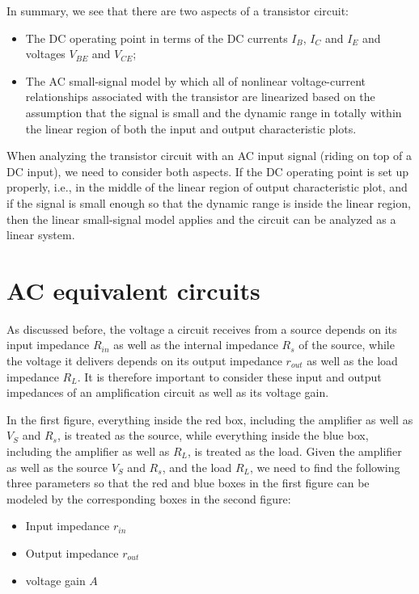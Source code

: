 \begin{itemize}
In summary, we see that there are two aspects of a transistor circuit:
\begin{itemize}
\item The DC operating point in terms of the DC currents $I_B$, $I_C$ 
  and $I_E$ and voltages $V_{BE}$ and $V_{CE}$;
\item The AC small-signal model by which all of nonlinear voltage-current 
  relationships associated with the transistor are linearized based 
  on the assumption that the signal is small and the dynamic range 
  in totally within the linear region of both the input and output
  characteristic plots. 
\end{itemize}
When analyzing the transistor circuit with an AC input signal (riding 
on top of a DC input), we need to consider both aspects. If the DC 
operating point is set up properly, i.e., in the middle of the linear
region of output characteristic plot, and if the signal is small enough 
so that the dynamic range is inside the linear region, then the linear 
small-signal model applies and the circuit can be analyzed as a linear 
system.


\section*{AC equivalent circuits}

As discussed before, the voltage a circuit receives from a source 
depends on its input impedance $R_{in}$ as well as the internal 
impedance $R_s$ of the source, while the voltage it delivers depends
on its output impedance $r_{out}$ as well as the load impedance $R_L$.
It is therefore important to consider these input and output impedances
of an amplification circuit as well as its voltage gain.


In the first figure, everything inside the red box, including the 
amplifier as well as $V_S$ and $R_s$, is treated as the source, while 
everything inside the blue box, including the amplifier as well as $R_L$,
is treated as the load. Given the amplifier as well as the source $V_S$ 
and $R_s$, and the load $R_L$, we need to find the following three
parameters so that the red and blue boxes in the first figure can be
modeled by the corresponding boxes in the second figure:

\begin{itemize}
\item Input impedance $r_{in}$
\item Output impedance $r_{out}$ 
\item voltage gain $A$
\end{itemize}


\end{itemize}
